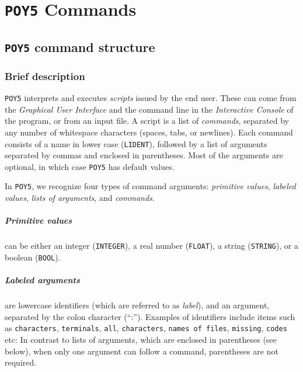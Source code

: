 \documentclass[11pt]{book}
\newcommand{\commandstyle}[1]{\texttt{#1}}
\newcommand{\poyargument}[1]{\commandstyle{#1}}
\newcommand{\poystring}{\commandstyle{STRING}\xspace}
\newcommand{\poyfloat}{\commandstyle{FLOAT}\xspace}
\newcommand{\poyint}{\commandstyle{INTEGER}\xspace}
\newcommand{\poybool}{\commandstyle{BOOL}}
\newcommand{\poylident}{\commandstyle{LIDENT}\xspace}
\newcommand{\poy}{\commandstyle{POY5}\xspace}
\begin{document}
\chapter{\poy Commands}\label{commands}

\section{\poy command structure}

\subsection{Brief description} \label{commands}

\poy interprets and executes \emph{scripts} issued by the end user.  These can
come from the \emph{Graphical User Interface} and the command line in the \emph{Interactive Console} 
of the program, or from an input file. A script is a list of \emph{commands}, separated by any number of 
whitespace characters (spaces, tabs, or newlines). Each command consists of a name in lower case 
(\poylident), followed by a list of arguments separated by commas and enclosed in parentheses. 
Most of the arguments are optional, in which case \poy has default values.

In \poy, we recognize four types of command arguments: \emph{primitive values},
\emph{labeled values}, \emph{lists of arguments}, and \emph{commands}.

\paragraph{Primitive values} can be either an integer (\poyint), a real number
(\poyfloat), a string (\poystring), or a boolean (\poybool).

\paragraph{Labeled arguments} are lowercase identifiers (which are referred to as
\emph{label}), and an argument, separated by the colon character (``:''). Examples 
of identifiers include items such as \poyargument{characters}, \poyargument{terminals}, 
\poyargument{all}, \poyargument{characters}, \texttt{names of files}, \poyargument{missing},
\poyargument{codes} etc:  In contrast to lists of arguments, which are enclosed in parentheses 
(see below), when only one argument can follow a command, parentheses are not required.
\end{document}
